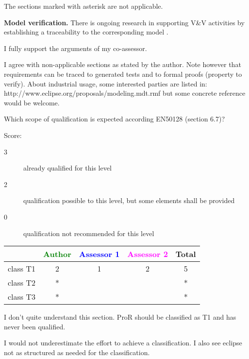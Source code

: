 \begin{author_comment}
The sections marked with asterisk are not applicable.

\textbf{Model verification.} There is ongoing research in supporting V\&V activities by establishing a traceability to the corresponding model \cite {HalJasLad2013}.

\end{author_comment}

\begin{assessor1}
I fully support the arguments of my co-assessor.
\end{assessor1}

\begin{assessor2}
I agree with non-applicable sections as stated by the author. Note however that requirements can be traced to generated tests and to formal proofs (property to verify). About industrial usage, some interested parties are listed in: http://www.eclipse.org/proposals/modeling.mdt.rmf but some concrete reference would be welcome.
\end{assessor2}

Which scope of qualification is expected according EN50128 (section 6.7)?

Score:
\begin{description}
\item[3] already qualified for this level
\item[2] qualification possible to this level, but some elements shall be provided
\item[0] qualification not recommended for this level
\end{description}


\begin{tabular}{|l | c | c | c | c|}
\hline
& \textcolor{green}{Author} & \textcolor{blue}{Assessor 1} & \textcolor{magenta}{Assessor 2} & Total \\
\hline
class T1 & 2 & 1 & 2 &  5 \\
\hline
class T2   & * & & & * \\
\hline
class T3  & * & & & * \\
\hline
\end{tabular}

\begin{author_comment}
I don't quite understand this section.  ProR should be classified as T1 and has never been qualified.
\end{author_comment}

\begin{assessor1}
I would not underestimate the effort to achieve a classification. I also see eclipse not as structured as needed for the classification.
\end{assessor1}

